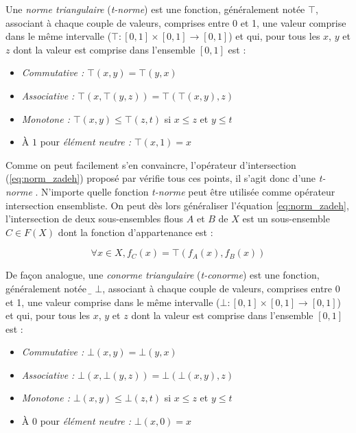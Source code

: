 Une \emph{norme triangulaire} (\emph{t-norme}) est une fonction,
généralement notée $\top$, associant à chaque couple de valeurs,
comprises entre 0 et 1, une valeur comprise dans le même intervalle
(\ie $\top : [0,1] × [0,1] \rightarrow [0,1]$) et qui, pour tous les
$x$, $y$ et $z$ dont la valeur est comprise dans l'ensemble $[0,1]$
est :

\begin{itemize}
\item \emph{Commutative :} \(⊤(x,y) = ⊤(y,x)\)
\item \emph{Associative :} \(⊤(x,⊤(y,z)) = ⊤(⊤(x,y),z)\)
\item \emph{Monotone :} \(⊤(x,y) ≤ ⊤(z,t)\) si \(x ≤ z\) et \(y ≤ t\)
\item À \(1\) pour \emph{élément neutre :} \(⊤(x,1) = x\)
\end{itemize}

Comme on peut facilement s'en convaincre, l'opérateur d'intersection
(\autoref{eq:norm_zadeh}) proposé par \textcite{Zadeh1965} vérifie
tous ces points, il s'agit donc d'une \emph{t-norme}
\autocite{Bouchon-Meunier2007}. N'importe quelle fonction
\emph{t-norme} peut être utilisée comme opérateur intersection
ensembliste. On peut dès lors généraliser l'équation
\ref{eq:norm_zadeh}, l'intersection de deux sous-ensembles flous \(A\)
et \(B\) de \(X\) est un sous-ensemble \(C ∈ F(X)\) dont la fonction
d’appartenance est :

\begin{equation}
   ∀x ∈ X, f_C (x) = ⊤(f_A(x), f_B(x))  
\end{equation}

De façon analogue, une \emph{conorme triangulaire} (\emph{t-conorme})
est une fonction, généralement notée \(̱⊥\), associant à chaque couple
de valeurs, comprises entre 0 et 1, une valeur comprise dans le même
intervalle (\ie $⊥ : [0,1] × [0,1] \rightarrow [0,1]$) et qui, pour
tous les $x$, $y$ et $z$ dont la valeur est comprise dans l'ensemble
$[0,1]$ est :

\begin{itemize}
\item \emph{Commutative :} \(⊥(x,y) = ⊥(y,x)\)
\item \emph{Associative :} \(⊥(x,⊥(y,z)) = ⊥(⊥(x,y),z)\)
\item \emph{Monotone :} \(⊥(x,y) ≤ ⊥(z,t)\) si \(x ≤ z\) et \(y ≤ t\)
\item À \(0\) pour \emph{élément neutre :} \(⊥(x,0) = x\)
\end{itemize}

